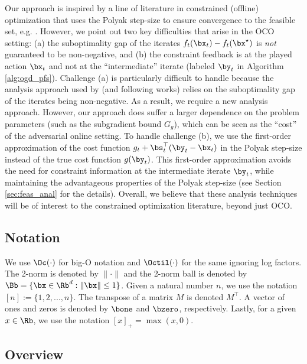 Our approach is inspired by a line of literature in constrained (offline) optimization that uses the Polyak step-size to ensure convergence to the feasible set, e.g. \cite{polyak2001random,nedic2011random,nedic2019random,necoara2022stochastic}.
However, we point out two key difficulties that arise in the OCO setting: (a) the suboptimality gap of the iterates $f_t(\bx_t) - f_t(\bx^\star)$ is \emph{not} guaranteed to be non-negative, and (b) the constraint feedback is at the played action $\bx_t$ and not at the ``intermediate'' iterate (labeled $\by_t$ in Algorithm \ref{alg:ogd_pfs}).
Challenge (a) is particularly difficult to handle because the analysis approach used by \citet{nedic2011random} (and following works) relies on the suboptimality gap of the iterates being non-negative.
As a result, we require a new analysis approach.
However, our approach does suffer a larger dependence on the problem parameters (such as the subgradient bound $G_g$), which can be seen as the ``cost'' of the adversarial online setting.
To handle challenge (b), we use the first-order approximation of the cost function $g_t + \bs_t^\top (\by_t - \bx_t)$ in the Polyak step-size instead of the true cost function $g(\by_t)$.
This first-order approximation avoids the need for constraint information at the intermediate iterate $\by_t$, while maintaining the advantageous properties of the Polyak step-size (see Section \ref{sec:feas_anal} for the details).
Overall, we believe that these analysis techniques will be of interest to the constrained optimization literature, beyond just OCO.

\subsection{Notation}

We use $\Oc(\cdot)$ for big-O notation and $\Octil(\cdot)$ for the same ignoring log factors.
The 2-norm is denoted by $\| \cdot \|$ and the 2-norm ball is denoted by $\Bb = \{ \bx \in \Rb^d : \| \bx \| \leq 1 \}$.
Given a natural number $n$, we use the notation $[n] := \{1, 2, ..., n \}$.
The transpose of a matrix $M$ is denoted $M^\top$.
A vector of ones and zeros is denoted by $\bone$ and $\bzero$, respectively.
Lastly, for a given $x \in \Rb$, we use the notation $[x]_+ = \max(x,0)$.

\subsection{Overview}

